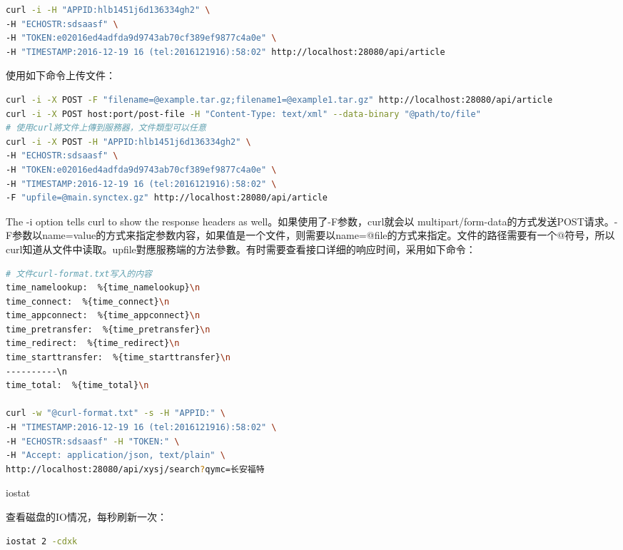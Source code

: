 \documentclass[12pt]{book}
\makeatletter
\numberwithin{dummy}{section}
\theoremstyle{ocrenumbox}
\theoremstyle{blacknumex}
\theoremstyle{blacknumbox}
\theoremstyle{ocrenum}
\renewcommand{\subsection}{\@startsection {subsection}{2}{\z@}
	{-3ex \@plus -0.1ex \@minus -.4ex}
	{0.5ex \@plus.2ex }
	{\normalfont\sffamily\bfseries}}
\newlength\esp
\makeatother
\begin{document}
\begin{lstlisting}[language=Bash]
curl -i -H "APPID:hlb1451j6d136334gh2" \ 
-H "ECHOSTR:sdsaasf" \
-H "TOKEN:e02016ed4adfda9d9743ab70cf389ef9877c4a0e" \
-H "TIMESTAMP:2016-12-19 16 (tel:2016121916):58:02" http://localhost:28080/api/article
\end{lstlisting}

使用如下命令上传文件：

\begin{lstlisting}[language=Bash]
curl -i -X POST -F "filename=@example.tar.gz;filename1=@example1.tar.gz" http://localhost:28080/api/article
curl -i -X POST host:port/post-file -H "Content-Type: text/xml" --data-binary "@path/to/file"
# 使用curl將文件上傳到服務器，文件類型可以任意
curl -i -X POST -H "APPID:hlb1451j6d136334gh2" \
-H "ECHOSTR:sdsaasf" \
-H "TOKEN:e02016ed4adfda9d9743ab70cf389ef9877c4a0e" \
-H "TIMESTAMP:2016-12-19 16 (tel:2016121916):58:02" \
-F "upfile=@main.synctex.gz" http://localhost:28080/api/article
\end{lstlisting}

The -i option tells curl to show the response headers as well。如果使用了-F参数，curl就会以 multipart/form-data的方式发送POST请求。-F参数以name=value的方式来指定参数内容，如果值是一个文件，则需要以name=@file的方式来指定。文件的路径需要有一个@符号，所以curl知道从文件中读取。upfile對應服務端的方法參數。有时需要查看接口详细的响应时间，采用如下命令：

\begin{lstlisting}[language=Bash]
# 文件curl-format.txt写入的内容
time_namelookup:  %{time_namelookup}\n
time_connect:  %{time_connect}\n
time_appconnect:  %{time_appconnect}\n
time_pretransfer:  %{time_pretransfer}\n
time_redirect:  %{time_redirect}\n
time_starttransfer:  %{time_starttransfer}\n
----------\n
time_total:  %{time_total}\n

curl -w "@curl-format.txt" -s -H "APPID:" \
-H "TIMESTAMP:2016-12-19 16 (tel:2016121916):58:02" \
-H "ECHOSTR:sdsaasf" -H "TOKEN:" \
-H "Accept: application/json, text/plain" \
http://localhost:28080/api/xysj/search?qymc=长安福特
\end{lstlisting}



\subsection{iostat}

查看磁盘的IO情况，每秒刷新一次：

\begin{lstlisting}[language=Bash]
iostat 2 -cdxk
\end{lstlisting}
\end{document}
